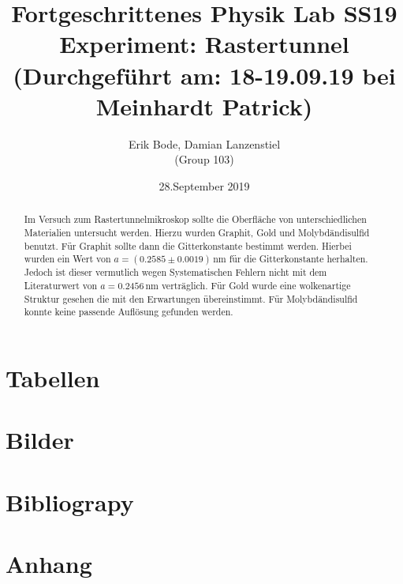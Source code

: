 \documentclass[30pt,a4paper]{article}
\title{
	\large Fortgeschrittenes Physik Lab	SS19 \\[4mm]
	\textbf{\LARGE Experiment: Rastertunnel
	} \\[4mm]
	(Durchgeführt am: 18-19.09.19 bei Meinhardt Patrick) \\}
\author{Erik Bode, Damian Lanzenstiel \\ (Group 103)}
\date{28.September 2019}
\begin{document}
	
	\begin{titlepage}
		\maketitle
		\vspace{2cm}
		\begin{abstract}
			Im Versuch zum Rastertunnelmikroskop sollte die Oberfläche von unterschiedlichen Materialien untersucht werden. Hierzu wurden Graphit, Gold und Molybdändisulfid benutzt. Für Graphit sollte dann die Gitterkonstante bestimmt werden. Hierbei wurden ein Wert von $a=(0.2585\pm0.0019)\,\text{nm}$ für die Gitterkonstante herhalten. Jedoch ist dieser vermutlich wegen Systematischen Fehlern nicht mit dem Literaturwert von $a=0.2456\,$nm verträglich. Für Gold wurde eine wolkenartige Struktur gesehen die mit den Erwartungen übereinstimmt. Für Molybdändisulfid konnte keine passende Auflösung gefunden werden. 
		\end{abstract}
	\end{titlepage}
	\newpage
	\tableofcontents
	\newpage
	
	
		
	
	
	
	
	
	
	\section{Tabellen}
	\listoftables
	\section{Bilder}
	\listoffigures
	\section{Bibliograpy}
	
	
	\section{Anhang}
	
\end{document}
